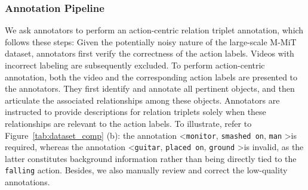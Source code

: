 \documentclass[letterpaper]{article}
\begin{document}
\subsubsection{Annotation Pipeline}
We ask annotators to perform an action-centric relation triplet annotation, which follows these steps:
Given the potentially noisy nature of the large-scale M-MiT dataset, annotators first verify the correctness of the action labels. Videos with incorrect labeling are subsequently excluded.
To perform action-centric annotation, both the video and the corresponding action labels are presented to the annotators. They first identify and annotate all pertinent objects, and then articulate the associated relationships among these objects.
Annotators are instructed to provide descriptions for relation triplets solely when these relationships are relevant to the action labels.
To illustrate, refer to Figure~\ref{tab:dataset_comp} (b): the annotation \textless \texttt{monitor}, \texttt{smashed on}, \texttt{man} \textgreater is required, whereas the annotation \textless \texttt{guitar}, \texttt{placed on}, \texttt{ground} \textgreater is invalid, as the latter constitutes background information rather than being directly tied to the \texttt{falling} action.
Besides, we also manually review and correct the low-quality annotations.
\end{document}
